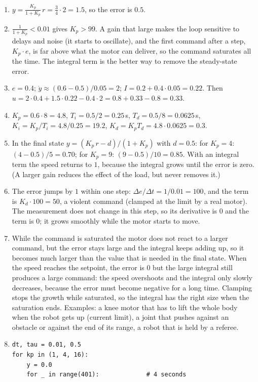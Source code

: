 \begin{enumerate}[label=\textbf{\ansnum.\arabic*}]
  \item $y=\frac{K_p}{1+K_p}\,r=\frac34\cdot2=1.5$, so the error is $0.5$.
  \item $\frac{1}{1+K_p}<0.01$ gives $K_p>99$. A gain that large makes the loop sensitive to delays and noise (it starts to oscillate), and the first command after a step, $K_p\cdot e$, is far above what the motor can deliver, so the command saturates all the time. The integral term is the better way to remove the steady-state error.
  \item $e=0.4$; $\dot y\approx(0.6-0.5)/0.05=2$; $I=0.2+0.4\cdot0.05=0.22$. Then $u=2\cdot0.4+1.5\cdot0.22-0.4\cdot2=0.8+0.33-0.8=0.33$.
  \item $K_p=0.6\cdot8=4.8$, $T_i=0.5/2=0.25$\,s, $T_d=0.5/8=0.0625$\,s, $K_i=K_p/T_i=4.8/0.25=19.2$, $K_d=K_pT_d=4.8\cdot0.0625=0.3$.
  \item In the final state $y=(K_p\,r-d)/(1+K_p)$ with $d=0.5$: for $K_p=4$: $(4-0.5)/5=0.70$; for $K_p=9$: $(9-0.5)/10=0.85$. With an integral term the speed returns to $1$, because the integral grows until the error is zero. (A larger gain reduces the effect of the load, but never removes it.)
  \item The error jumps by $1$ within one step: $\Delta e/\Delta t=1/0.01=100$, and the term is $K_d\cdot100=50$, a violent command (clamped at the limit by a real motor). The measurement does not change in this step, so its derivative is $0$ and the term is $0$; it grows smoothly while the motor starts to move.
  \item While the command is saturated the motor does not react to a larger command, but the error stays large and the integral keeps adding up, so it becomes much larger than the value that is needed in the final state. When the speed reaches the setpoint, the error is $0$ but the large integral still produces a large command: the speed overshoots and the integral only slowly decreases, because the error must become negative for a long time. Clamping stops the growth while saturated, so the integral has the right size when the saturation ends. Examples: a knee motor that has to lift the whole body when the robot gets up (current limit), a joint that pushes against an obstacle or against the end of its range, a robot that is held by a referee.
  \item
\begin{verbatim}
dt, tau = 0.01, 0.5
for kp in (1, 4, 16):
    y = 0.0
    for _ in range(401):             # 4 seconds

\end{verbatim}
\end{enumerate}
